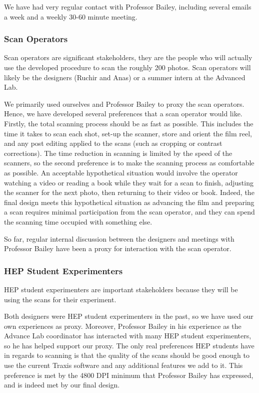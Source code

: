 \documentclass[12pt]{article} %
\begin{document}
We have had very regular contact with Professor Bailey, including several emails a week and a weekly 30-60 minute meeting.

\subsubsection{Scan Operators} \label{scanopsscanning}
Scan operators are significant stakeholders, they are the people who will actually use the developed procedure to scan the roughly 200 photos. Scan operators will likely be the designers (Ruchir and Anas) or a summer intern at the Advanced Lab.

We primarily used ourselves and Professor Bailey to proxy the scan operators. Hence, we have developed several preferences that a scan operator would like. Firstly, the total scanning process should be as fast as possible. This includes the time it takes to scan each shot, set-up the scanner, store and orient the film reel, and any post editing applied to the scans (such as cropping or contrast corrections). The time reduction in scanning is limited by the speed of the scanners, so the second preference is to make the scanning process as comfortable as possible. An acceptable hypothetical situation would involve the operator watching a video or reading a book while they wait for a scan to finish, adjusting the scanner for the next photo, then returning to their video or book. Indeed, the final design meets this hypothetical situation as advancing the film and preparing a scan requires minimal participation from the scan operator, and they can spend the scanning time occupied with something else.

So far, regular internal discussion between the designers and meetings with Professor Bailey have been a proxy for interaction with the scan operator.

\subsubsection{HEP Student Experimenters}
HEP student experimenters are important stakeholders because they will be using the scans for their experiment.

Both designers were HEP student experimenters in the past, so we have used our own experiences as proxy. Moreover, Professor Bailey in his experience as the Advance Lab coordinator has interacted with many HEP student experimenters, so he has helped support our proxy. The only real preferences HEP students have in regards to scanning is that the quality of the scans should be good enough to use the current Traxis software and any additional features we add to it. This preference is met by the 4800 DPI minimum that Professor Bailey has expressed, and is indeed met by our final design.
\end{document}
